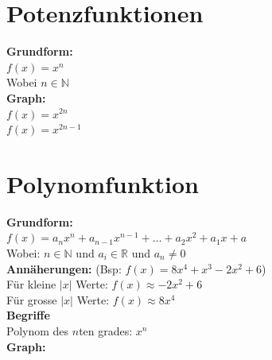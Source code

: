 \documentclass[11pt,twocolumn,a4paper]{article}
\title{\titleText}
\author{\authorText}
\date{\dateText}
\newcommand*{\field}[1]{\mathbb{#1}}%
\begin{document}
\section{Potenzfunktionen}
\textbf{Grundform:}\\
\(f(x) = x^n\)\\Wobei \(n \in \field{N}\)\\
\textbf{Graph:}\\

\(f(x) = x^{2n}\)\\
\(f(x) = x^{2n-1}\)

\section{Polynomfunktion}
\textbf{Grundform:}\\
\(f(x) = a_nx^n + a_{n-1}x^{n-1} + \dots + a_2x^2 + a_1x + a \)\\
Wobei: \(n \in \field{N}\) und \(a_i \in \field{R}\) und \(a_n \ne 0\)\\
\textbf{Annäherungen:} (Bsp: \(f(x)=8x^4+x^3-2x^2+6\))\\
Für kleine \(|x|\) Werte: \(f(x) \approx -2x^2 + 6\)\\
Für grosse \(|x|\) Werte: \(f(x) \approx 8x^4\)\\
\textbf{Begriffe}\\
Polynom des \(n\)ten grades: \(x^n\)\\
\textbf{Graph:}\\
\end{document}
